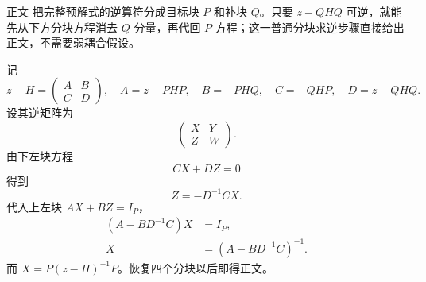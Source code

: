 \begin{derivation}

正文 把完整预解式的逆算符分成目标块 $P$ 和补块 $Q$。只要 $z-QHQ$ 可逆，就能先从下方分块方程消去 $Q$ 分量，再代回 $P$ 方程；这一普通分块求逆步骤直接给出正文，不需要弱耦合假设。

记
\begin{equation*}
 z-H=
 \begin{pmatrix}A&B\\C&D\end{pmatrix},
 \quad
 A=z-PHP,
 \quad B=-PHQ,
 \quad C=-QHP,
 \quad D=z-QHQ.
\end{equation*}
设其逆矩阵为
\begin{equation*}
 \begin{pmatrix}X&Y\\Z&W\end{pmatrix}.
\end{equation*}
由下左块方程
\begin{equation*}
 CX+DZ=0
\end{equation*}
得到
\begin{equation*}
 Z=-D^{-1}CX.
\end{equation*}
代入上左块 $AX+BZ=I_P$，
\begin{align*}
 (A-BD^{-1}C)X&=I_P,\\
 X&=(A-BD^{-1}C)^{-1}.
\end{align*}
而 $X=P(z-H)^{-1}P$。恢复四个分块以后即得正文。
\end{derivation}

